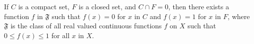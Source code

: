If $C$ is a compact set, $F$ is a closed set, and $C \cap F = 0$, then there exists a function $f$ in $\mathfrak{F}$ such that $f(x) = 0$ for $x$ in $C$ and $f(x) = 1$ for $x$ in $F$, where $\mathfrak{F}$ is the class of all real valued continuous functions $f$ on $X$ such that $0 \leq f(x) \leq 1$ for all $x$ in $X$.
